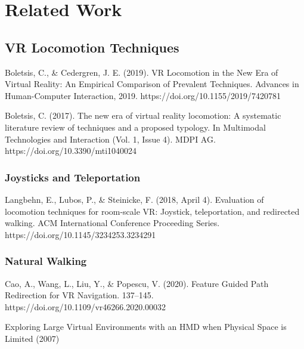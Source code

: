 
%

\chapter{Related Work}
\label{cha:related_work}

\glsresetall

\section{VR Locomotion Techniques}
\label{sec:vr-locomotion-techniques}

Boletsis, C., \& Cedergren, J. E. (2019). VR Locomotion in the New Era of Virtual Reality: An Empirical Comparison of Prevalent Techniques. Advances in Human-Computer Interaction, 2019. https://doi.org/10.1155/2019/7420781

Boletsis, C. (2017). The new era of virtual reality locomotion: A systematic literature review of techniques and a proposed typology. In Multimodal Technologies and Interaction (Vol. 1, Issue 4). MDPI AG. https://doi.org/10.3390/mti1040024

\subsection{Joysticks and Teleportation}
\label{sec:joysticks-and-teleportation}

Langbehn, E., Lubos, P., \& Steinicke, F. (2018, April 4). Evaluation of locomotion techniques for room-scale VR: Joystick, teleportation, and redirected walking. ACM International Conference Proceeding Series. https://doi.org/10.1145/3234253.3234291

\subsection{Natural Walking}
\label{sec:natural-walking}

Cao, A., Wang, L., Liu, Y., \& Popescu, V. (2020). Feature Guided Path Redirection for VR Navigation. 137–145. https://doi.org/10.1109/vr46266.2020.00032

Exploring Large Virtual Environments with an HMD when Physical Space is Limited (2007)

